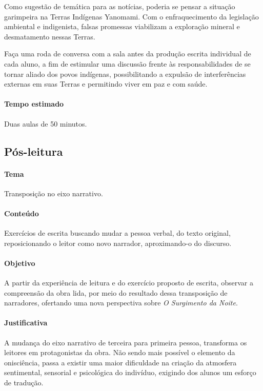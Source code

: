 \documentclass[12pt]{extarticle}
\begin{document}
Como sugestão de temática para as notícias, poderia se pensar a situação garimpeira na Terras
Indígenas Yanomami. Com o enfraquecimento da legislação ambiental e indigenista, falsas promessas
viabilizam a exploração mineral e desmatamento nessas Terras.

Faça uma roda de conversa com a sala antes da produção escrita individual de cada aluno, a fim de
estimular uma discussão frente às responsabilidades de se tornar aliado dos povos indígenas, possibilitando
a expulsão de interferências externas em suas Terras e permitindo viver em paz e com saúde.  


\paragraph{Tempo estimado} Duas aulas de 50 minutos.


\subsection{Pós-leitura}


\paragraph{Tema} Transposição no eixo narrativo.

\paragraph{Conteúdo} Exercícios de escrita buscando mudar a pessoa verbal, 
do texto original, reposicionando o leitor como novo narrador, aproximando-o
do discurso.

\paragraph{Objetivo} A partir da experiência de leitura e do exercício proposto
de escrita, observar a compreensão da obra lida, por meio do resultado dessa 
transposição de narradores, ofertando uma nova perspectiva sobre \textit{O Surgimento da Noite}. 

\paragraph{Justificativa} A mudança do eixo narrativo de terceira para primeira
pessoa, transforma os leitores em protagonistas da obra. Não sendo mais possível
o elemento da onisciência, passa a existir uma maior dificuldade na criação da 
atmosfera sentimental, sensorial e psicológica do indivíduo, exigindo dos alunos
um esforço de tradução.
\end{document}
